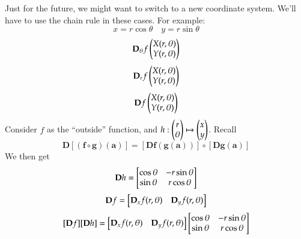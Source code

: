 Just for the future, we might want to switch to a new coordinate system. We'll have to use the chain rule in these cases. For example:
\[x=r\cos{\theta} \quad y=r\sin{\theta}\]
\[\textbf{D}_\theta f\begin{pmatrix} X(r,\theta) \\ Y(r, \theta) \end{pmatrix}\]
\[\textbf{D}_r f\begin{pmatrix} X(r,\theta) \\ Y(r, \theta) \end{pmatrix}\]
\[\textbf{D} f\begin{pmatrix} X(r,\theta) \\ Y(r, \theta) \end{pmatrix}\]
Consider $f$ as the ``outside'' function, and $h : \begin{pmatrix} r \\ \theta \end{pmatrix}\mapsto \begin{pmatrix} x \\ y \end{pmatrix}$. Recall
\[\bm{D}[(\bm{f}\circ \bm{g})(\bm{a})]=[\bm{Df} (\bm{g}(\bm{a}))]\circ [\bm{Dg}(\bm{a})]\]
We then get
\[\textbf{D}h = \begin{bmatrix} \cos\theta & -r\sin\theta \\ \sin\theta & r\cos\theta \end{bmatrix}\]
\[\textbf{D}f = \begin{bmatrix} \textbf{D}_xf(r,\theta) & \textbf{D}_yf(r,\theta) \end{bmatrix}\]
\[[\textbf{D}f][\textbf{D}h]=\begin{bmatrix} \textbf{D}_xf(r,\theta) & \textbf{D}_yf(r,\theta) \end{bmatrix}\begin{bmatrix} \cos\theta & -r\sin\theta \\ \sin\theta & r\cos\theta \end{bmatrix}\]

